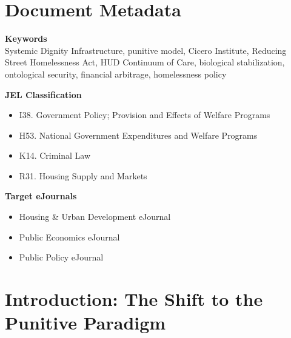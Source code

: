 \documentclass[12pt, letterpaper]{article}
\begin{document}

\newpage
\section*{Document Metadata}

{\footnotesize{}

\noindent\textbf{Keywords}\\[1pt]
Systemic Dignity Infrastructure, punitive model, Cicero Institute, Reducing Street Homelessness Act, HUD Continuum of Care, biological stabilization, ontological security, financial arbitrage, homelessness policy

\vspace{8pt}
\noindent\textbf{JEL Classification}
\begin{itemize}[nosep, before={\vspace{-8pt}}, leftmargin=2em]
    \item I38. Government Policy; Provision and Effects of Welfare Programs
    \item H53. National Government Expenditures and Welfare Programs
    \item K14. Criminal Law
    \item R31. Housing Supply and Markets
\end{itemize}

\vspace{8pt}
\noindent\textbf{Target eJournals}
\begin{itemize}[nosep, before={\vspace{-8pt}}, leftmargin=2em]
    \item Housing \& Urban Development eJournal
    \item Public Economics eJournal
    \item Public Policy eJournal
\end{itemize}



}

\newpage
\begingroup
{}
\setlength{\cftbeforesecskip}{2pt}
\setlength{\cftbeforesubsecskip}{-2pt}
\tableofcontents
\endgroup

\newpage
{}


\section{Introduction: The Shift to the Punitive Paradigm}
\end{document}
